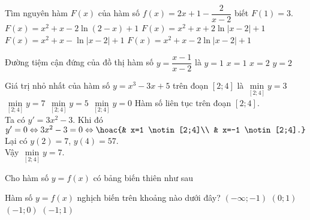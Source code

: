 \begin{ex}%
	Tìm nguyên hàm $F(x)$ của hàm số $f(x)=2x+1-\dfrac{2}{x-2}$ biết $F(1)=3$.
	\choice
	{$F(x)=x^2+x-2\ln (2-x)+1$}
	{$F(x)=x^2+x+2\ln |x-2|+1$}
	{$F(x)=x^2+x-\ln |x-2|+1$}
	{\True $F(x)=x^2+x-2\ln |x-2|+1$}
\end{ex}

\begin{ex}%
	Đường tiệm cận đứng của đồ thị hàm số $y=\dfrac{x-1}{x-2}$ là 
	\choice
	{$y=1$}
	{$x=1$}
	{\True $x=2$}
	{$y=2$}
\end{ex}

\begin{ex}%
	Giá trị nhỏ nhất của hàm số $y=x^3-3x+5$ trên đoạn $[2;4]$ là
	\choice
	{$\min\limits_{[2;4]} y=3$}
	{\True $\min\limits_{[2;4]} y=7$}
	{$\min\limits_{[2;4]} y=5$}
	{$\min\limits_{[2;4]} y=0$}
	\loigiai
	{
		Hàm số liên tục trên đoạn $[2;4]$.\\
		Ta có $y'=3x^2-3$. Khi đó
		$y'=0 \Leftrightarrow 3x^2-3=0 \Leftrightarrow \hoac{& x=1 \notin [2;4]\\ & x=-1 \notin [2;4].}$\\
		Lại có $y(2)=7$, $y(4)=57$.\\
		Vậy $\min\limits_{[2;4]} y=7$.
	}
\end{ex}

\begin{ex}%
	Cho hàm số $y=f(x)$ có bảng biến thiên như sau
	\begin{center}
	\end{center}
	Hàm số $y=f(x)$ nghịch biến trên khoảng nào dưới đây?
	\choice
	{$(-\infty ;-1)$}
	{$(0;1)$}
	{\True $(-1;0)$}
	{$(-1;1)$}
\end{ex}

